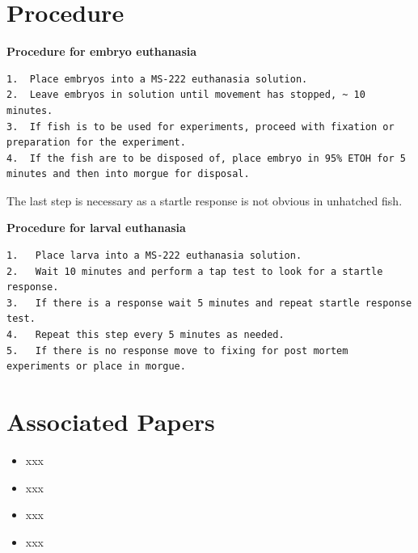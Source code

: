 \documentclass[
  letterpaper,
  DIV=11,
  numbers=noendperiod]{scrreprt}
\providecommand{\tightlist}{%
  \setlength{\itemsep}{0pt}\setlength{\parskip}{0pt}}\usepackage{longtable,booktabs,array}
\begin{document}
\hypertarget{procedure-53}{%
\section{Procedure}\label{procedure-53}}

\textbf{Procedure for embryo euthanasia}

\begin{verbatim}
1.  Place embryos into a MS-222 euthanasia solution.
2.  Leave embryos in solution until movement has stopped, ~ 10 minutes.
3.  If fish is to be used for experiments, proceed with fixation or preparation for the experiment.
4.  If the fish are to be disposed of, place embryo in 95% ETOH for 5 minutes and then into morgue for disposal.
\end{verbatim}

\begin{tcolorbox}[enhanced jigsaw, rightrule=.15mm, title=\textcolor{quarto-callout-warning-color}{\faExclamationTriangle}\hspace{0.5em}{NOTES}, titlerule=0mm, opacitybacktitle=0.6, toprule=.15mm, bottomrule=.15mm, opacityback=0, left=2mm, colframe=quarto-callout-warning-color-frame, breakable, coltitle=black, colback=white, colbacktitle=quarto-callout-warning-color!10!white, bottomtitle=1mm, leftrule=.75mm, toptitle=1mm, arc=.35mm]

The last step is necessary as a startle response is not obvious in
unhatched fish.

\end{tcolorbox}

\textbf{Procedure for larval euthanasia}

\begin{verbatim}
1.   Place larva into a MS-222 euthanasia solution.
2.   Wait 10 minutes and perform a tap test to look for a startle response.
3.   If there is a response wait 5 minutes and repeat startle response test.
4.   Repeat this step every 5 minutes as needed.
5.   If there is no response move to fixing for post mortem experiments or place in morgue.
\end{verbatim}

\hypertarget{associated-papers-36}{%
\section{Associated Papers}\label{associated-papers-36}}

\begin{itemize}
\tightlist
\item
  xxx
\item
  xxx
\item
  xxx
\item
  xxx
\end{itemize}
\end{document}

